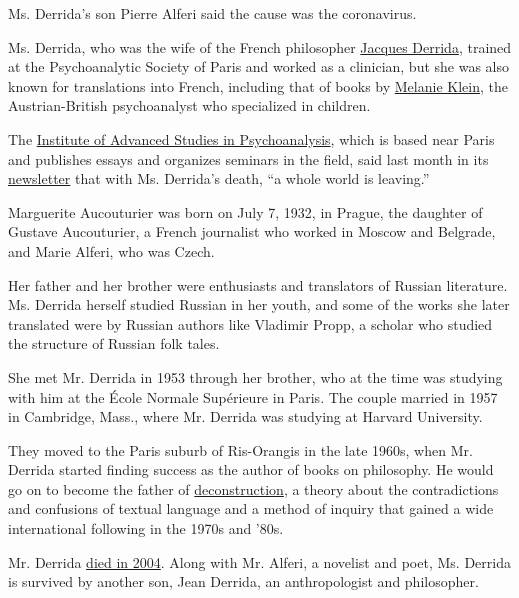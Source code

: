 Ms. Derrida's son Pierre Alferi said the cause was the coronavirus.

Ms. Derrida, who was the wife of the French philosopher
\href{https://www.nytimes3xbfgragh.onion/1994/01/23/magazine/jacques-derrida.html?searchResultPosition=1}{Jacques
Derrida}, trained at the Psychoanalytic Society of Paris and worked as a
clinician, but she was also known for translations into French,
including that of books by
\href{https://www.nytimes3xbfgragh.onion/1960/09/23/archives/melanie-klein-is-dead-at-78-child-psychologist-in-britain-special.html?searchResultPosition=2}{Melanie
Klein}, the Austrian-British psychoanalyst who specialized in children.

The \href{http://psychanalyse.ihep.fr/}{Institute of Advanced Studies in
Psychoanalysis}, which is based near Paris and publishes essays and
organizes seminars in the field, said last month in its
\href{https://mailchi.mp/c133515b4808/la-lettre-de-lihep-21-mars-2020?fbclid=IwAR2pFA1Xe7iBcx2Os8u7HT5rAp5OK5QyiYLnhqSmCWCc1Ou8UPUOgnywrH8}{newsletter}
that with Ms. Derrida's death, ``a whole world is leaving.''

Marguerite Aucouturier was born on July 7, 1932, in Prague, the daughter
of Gustave Aucouturier, a French journalist who worked in Moscow and
Belgrade, and Marie Alferi, who was Czech.

Her father and her brother were enthusiasts and translators of Russian
literature. Ms. Derrida herself studied Russian in her youth, and some
of the works she later translated were by Russian authors like Vladimir
Propp, a scholar who studied the structure of Russian folk tales.

She met Mr. Derrida in 1953 through her brother, who at the time was
studying with him at the École Normale Supérieure in Paris. The couple
married in 1957 in Cambridge, Mass., where Mr. Derrida was studying at
Harvard University.

They moved to the Paris suburb of Ris-Orangis in the late 1960s, when
Mr. Derrida started finding success as the author of books on
philosophy. He would go on to become the father of
\href{https://www.britannica.com/topic/deconstruction}{deconstruction},
a theory about the contradictions and confusions of textual language and
a method of inquiry that gained a wide international following in the
1970s and '80s.

Mr. Derrida
\href{https://www.nytimes3xbfgragh.onion/2004/10/10/obituaries/jacques-derrida-abstruse-theorist-dies-at-74.html}{died
in 2004}. Along with Mr. Alferi, a novelist and poet, Ms. Derrida is
survived by another son, Jean Derrida, an anthropologist and
philosopher.

